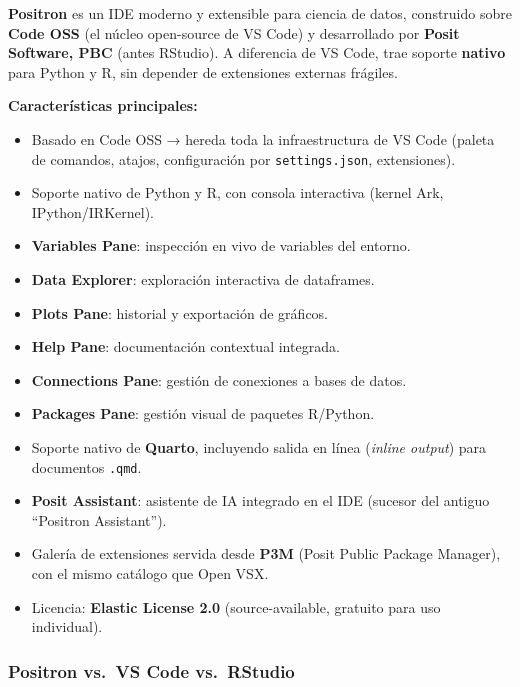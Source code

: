 \documentclass[
  doc,
  floatsintext,
  longtable,
  a4paper,
  nolmodern,
  notxfonts,
  notimes,
  12pt,
  colorlinks=true,linkcolor=blue,citecolor=blue,urlcolor=blue]{apa7}
\providecommand{\tightlist}{%
  \setlength{\itemsep}{0pt}\setlength{\parskip}{0pt}}
\begin{document}
\textbf{Positron} es un IDE moderno y extensible para ciencia de datos,
construido sobre \textbf{Code OSS} (el núcleo open-source de VS Code) y
desarrollado por \textbf{Posit Software, PBC} (antes RStudio). A
diferencia de VS Code, trae soporte \textbf{nativo} para Python y R, sin
depender de extensiones externas frágiles.

\textbf{Características principales:}

\begin{itemize}
\tightlist
\item
  Basado en Code OSS → hereda toda la infraestructura de VS Code (paleta
  de comandos, atajos, configuración por \texttt{settings.json},
  extensiones).
\item
  Soporte nativo de Python y R, con consola interactiva (kernel Ark,
  IPython/IRKernel).
\item
  \textbf{Variables Pane}: inspección en vivo de variables del entorno.
\item
  \textbf{Data Explorer}: exploración interactiva de dataframes.
\item
  \textbf{Plots Pane}: historial y exportación de gráficos.
\item
  \textbf{Help Pane}: documentación contextual integrada.
\item
  \textbf{Connections Pane}: gestión de conexiones a bases de datos.
\item
  \textbf{Packages Pane}: gestión visual de paquetes R/Python.
\item
  Soporte nativo de \textbf{Quarto}, incluyendo salida en línea
  (\emph{inline output}) para documentos \texttt{.qmd}.
\item
  \textbf{Posit Assistant}: asistente de IA integrado en el IDE (sucesor
  del antiguo ``Positron Assistant'').
\item
  Galería de extensiones servida desde \textbf{P3M} (Posit Public
  Package Manager), con el mismo catálogo que Open VSX.
\item
  Licencia: \textbf{Elastic License 2.0} (source-available, gratuito
  para uso individual).
\end{itemize}

\subsubsection{Positron vs.~VS Code
vs.~RStudio}\label{positron-vs.-vs-code-vs.-rstudio}
\end{document}
